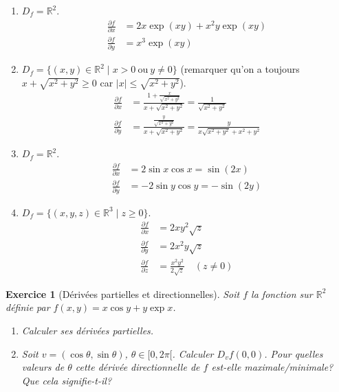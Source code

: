 \documentclass[11pt,a4paper]{article}
\newcommand{\Rr}{\mathbb{R}} \newcommand{\R}{\mathbb{R}}
\renewcommand{\ge}{\geqslant} \renewcommand{\geq}{\geqslant}
\renewcommand{\le}{\leqslant} \renewcommand{\leq}{\leqslant}
\theoremstyle{exostyle}
\newtheorem{exo}{Exercice}
\newcommand{\exercice}[1]{} \newcommand{\finexercice}{}
\newcommand{\enonce}{\begin{exo}} \newcommand{\finenonce}{\end{exo}}
\begin{document}
\noindent
\begin{enumerate}  
	
	\item $D_f=\R^2$. 
	\begin{align*}
		\frac{\partial f}{\partial x}&= 2x\exp(xy)+x^2y\exp(xy)
		\\
		\frac{\partial f}{\partial y}&= x^3\exp(xy)
	\end{align*}
	\noindent
	\item $D_f=\{(x,y) \in \Rr^2 \mid x > 0 \ \text{ou} \ y \ne 0\}$ (remarquer qu'on a toujours $x+\sqrt{x^2+y^2}\ge0$ car $|x| \le \sqrt{x^2+y^2}$).
	\begin{align*}
		\frac{\partial f}{\partial x}&= 
		\frac{1+\frac{x}{\sqrt{x^2+y^2}}}{x+\sqrt{x^2+y^2}}= 
		\frac 1{\sqrt{x^2+y^2}}
		\\
		\frac{\partial f}{\partial y}&=  
		\frac{\frac{y}{\sqrt{x^2+y^2}}}{x+\sqrt{x^2+y^2}}
		=\frac{y}{x\sqrt{x^2+y^2}+x^2+y^2}
	\end{align*}
	
	\item $D_f=\R^2$. 
	\begin{align*}
		\frac{\partial f}{\partial x}&= 2\sin x \cos x = \sin(2x)
		\\
		\frac{\partial f}{\partial y}&= -2\sin y \cos y = -\sin(2y)
	\end{align*}
	
	\item $D_f=\{(x,y,z) \in \Rr^3 \mid z \ge 0\}$.
	\begin{align*}
		\frac{\partial f}{\partial x}&= 2xy^2\sqrt{z}
		\\
		\frac{\partial f}{\partial y}&= 2x^2y\sqrt{z} 
		\\
		\frac{\partial f}{\partial z}&= \frac {x^2y^2}{2\sqrt{z}}  \quad (z\neq0)
	\end{align*}
\end{enumerate}
\fincorrection
\finexercice



\exercice{2623, debievre, 2009/05/19}
\enonce[Dérivées partielles et directionnelles]

Soit $f$ la fonction sur $\R^2$ définie par $f(x,y)= x\cos y + y\exp x$. 
\begin{enumerate}
	\item Calculer ses dérivées partielles.
	\item Soit $v=(\cos \theta, \sin \theta)$, $\theta\in [0,2\pi[$. Calculer $D_vf(0,0)$. Pour quelles valeurs de $\theta$ cette dérivée directionnelle de $f$ est-elle maximale/minimale? Que cela signifie-t-il?
\end{enumerate}
\finenonce
\end{document}
